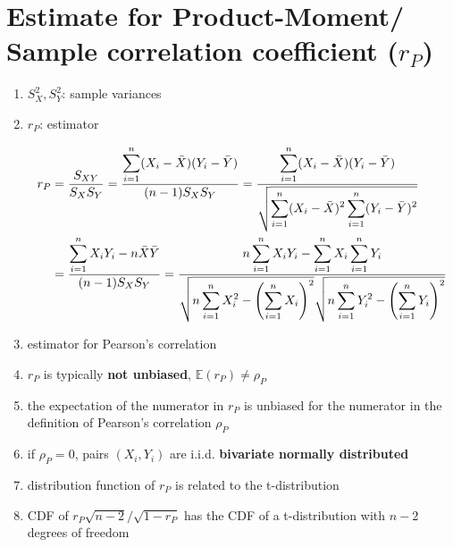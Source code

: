 \section{Estimate for Product-Moment/ Sample correlation coefficient ($r_P$) \cite{ism-1}} \label{Multivariate Distributions: Estimate for Product-Moment/ Sample correlation coefficient}

\begin{enumerate}
    \item[] $S_X^2 , S_Y^2$: sample variances
    \item[] $r_P$: estimator

    \begin{align*}
        r_P
        &= \dfrac{S_{XY}}{S_X S_Y}
        = \dfrac{
            \displaystyle\sum_{i=1}^{n} (X_i - \bar{X})(Y_i - \bar{Y})
        }{(n-1)S_X S_Y}
        = \dfrac{
            \displaystyle\sum_{i=1}^{n} (X_i - \bar{X})(Y_i - \bar{Y})
        }{\sqrt{
            \displaystyle\sum_{i=1}^{n} (X_i - \bar{X})^2
            \displaystyle\sum_{i=1}^{n} (Y_i - \bar{Y})^2
        }}\\
        &= \dfrac{
            \displaystyle\sum_{i=1}^{n} X_iY_i - 
            n\bar{X}\bar{Y}
        }{(n-1)S_X S_Y}
        = \dfrac{
            n\displaystyle\sum_{i=1}^n X_iY_i - \displaystyle\sum_{i=1}^n X_i \displaystyle\sum_{i=1}^n Y_i
        }{\sqrt{
            n\displaystyle\sum_{i=1}^{n} X_i^2 - \left(\displaystyle\sum_{i=1}^{n} X_i\right)^2
        }\sqrt{
            n\displaystyle\sum_{i=1}^{n} Y_i^2 - \left(\displaystyle\sum_{i=1}^{n} Y_i\right)^2
        }}
    \end{align*}

    \item estimator for Pearson’s correlation

    \item $r_P$ is typically \textbf{not unbiased}, $\mathbb{E}(r_P) \neq \rho_P$
    
    \item the expectation of the numerator in $r_P$ is unbiased for the numerator in the definition of Pearson’s correlation $\rho_P$

    \item if $\rho_P = 0$, pairs $(X_i, Y_i)$ are i.i.d. \textbf{bivariate normally distributed}

    \item distribution function of $r_P$ is related to the t-distribution

    \item CDF of $r_P\sqrt{n-2}/\sqrt{1-r_P}$ has the CDF of a t-distribution with $n - 2$ degrees of freedom


\end{enumerate}
